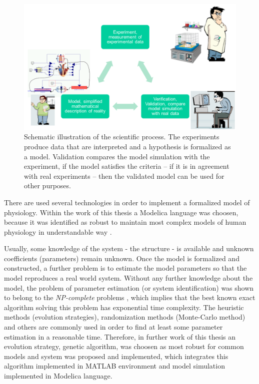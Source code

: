 \begin{figure}[ht]
    \centering
    \includegraphics[width=1\textwidth]{../chapter3/modeling.png}
    \caption{Schematic illustration of the scientific process. The experiments produce data that are interpreted and a hypothesis is formalized as a model. Validation compares the model simulation with the experiment, if the model satisfies the criteria -- if it is in agreement with real experiments -- then the validated model can be used for other purposes. 
    }
    \label{fig:modeling}
\end{figure}

There are used several technologies in order to implement a formalized model of physiology. Within the work of this thesis a Modelica language was choosen, because it was identified as robust to maintain most complex models of human physiology in understandable way \cite{Kofranek2011hummod}.

Usually, some knowledge of the system - the structure - is available and unknown coefficients (parameters) remain unknown. Once the model is formalized and constructed, a further problem is to estimate the model parameters so that the model reproduces a real world system. Without any further knowledge about the model, the problem of parameter estimation (or system identification) was shown to belong to the \emph{NP-complete} problems \cite{Hofmann2005}, which implies that the best known exact algorithm solving this problem has exponential time complexity. The heuristic methods (evolution strategies), randomization methods (Monte-Carlo method) and others are commonly used in order to find at least some parameter estimation in a reasonable time. Therefore, in further  work of this thesis an evolution strategy, genetic algorithm, was choosen as most robust for common models and system was proposed and implemented, which integrates this algorithm implemented in MATLAB environment and model simulation implemented in Modelica language.

